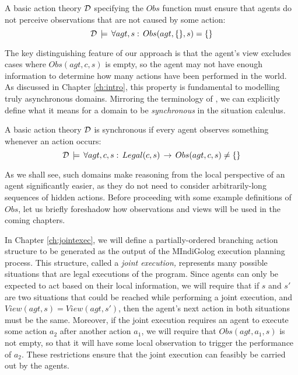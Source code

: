 \begin{defnL}
 A basic action theory
$\mathcal{D}$ specifying the $Obs$ function must ensure that agents do not
perceive observations that are not caused by some action:\[
\mathcal{D}\,\models\,\forall agt,s:\, Obs(agt,\{\},s)=\{\}\]

\end{defnL}
The key distinguishing feature of our approach is that the agent's
view excludes cases where $Obs(agt,c,s)$ is empty, so the agent may
not have enough information to determine how many actions have been
performed in the world. As discussed in Chapter \ref{ch:intro}, this
property is fundamental to modelling truly asynchronous domains. Mirroring
the terminology of \citep{vanBentham06tree_of_knowledge}, we can
explicitly define what it means for a domain to be \emph{synchronous}
in the situation calculus.

\begin{defnL}
 A basic action theory $\mathcal{D}$
is synchronous if every agent observes something whenever an action
occurs:\label{def:Synchronous-Action-Theory}\[
\mathcal{D}\,\models\,\forall agt,c,s:\, Legal(c,s)\,\rightarrow\, Obs(agt,c,s)\neq\{\}\]

\end{defnL}
As we shall see, such domains make reasoning from the local perspective
of an agent significantly easier, as they do not need to consider
arbitrarily-long sequences of hidden actions. Before proceeding with
some example definitions of $Obs$, let us briefly foreshadow how
observations and views will be used in the coming chapters.

In Chapter \ref{ch:jointexec}, we will define a partially-ordered
branching action structure to be generated as the output of the MIndiGolog
execution planning process. This structure, called a \emph{joint execution,}
represents many possible situations that are legal executions of the
program. Since agents can only be expected to act based on their local
information, we will require that if $s$ and $s'$ are two situations
that could be reached while performing a joint execution, and $View(agt,s)=View(agt,s')$,
then the agent's next action in both situations must be the same.
Moreover, if the joint execution requires an agent to execute some
action $a_{2}$ after another action $a_{1}$, we will require that
$Obs(agt,a_{1},s)$ is not empty, so that it will have some local
observation to trigger the performance of $a_{2}$. These restrictions
ensure that the joint execution can feasibly be carried out by the
agents.

